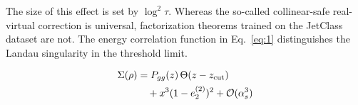 The size of this effect is set by $\log^2 \tau$. Whereas the so-called
collinear-safe real-virtual correction is universal, factorization
theorems trained on the JetClass dataset are not. The energy correlation
function in Eq.~\eqref{eq:1} distinguishes the Landau singularity in the
threshold limit.

\begin{align}
  \Sigma(\rho) &= P_{gg}(z) \, \Theta(z - z_{\rm cut}) \nonumber \\
  &\quad + {x}^{3} (1 - e_2^{(2)})^{2} + \mathcal{O}(\alpha_s^3) \label{eq:2}
\end{align}

